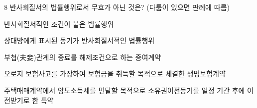 \begin{question}{8}
반사회질서의 법률행위로서 무효가 아닌 것은? (다툼이 있으면 판례에 따름)
\begin{choices}
  \item 반사회질서적인 조건이 붙은 법률행위
  \item 상대방에게 표시된 동기가 반사회질서적인 법률행위
  \item 부첩(夫妾)관계의 종료를 해제조건으로 하는 증여계약
  \item 오로지 보험사고를 가장하여 보험금을 취득할 목적으로 체결한 생명보험계약
  \item 주택매매계약에서 양도소득세를 면탈할 목적으로 소유권이전등기를 일정 기간 후에 이전받기로 한 특약
\end{choices}
\end{question}
